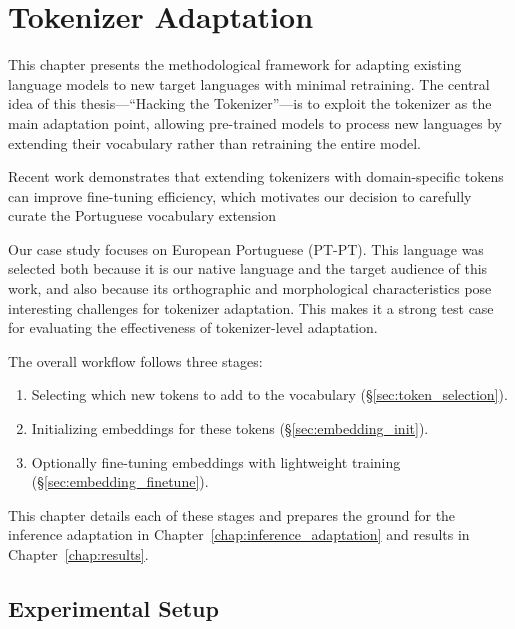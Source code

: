 
\chapter{Tokenizer Adaptation}


\label{chap:tokenizer_adaptation}

This chapter presents the methodological framework for adapting existing language models to new target languages with minimal retraining. The central idea of this thesis—“Hacking the Tokenizer”—is to exploit the tokenizer as the main adaptation point, allowing pre-trained models to process new languages by extending their vocabulary rather than retraining the entire model. 

Recent work \cite{kim2025finetune} demonstrates that extending tokenizers with domain-specific tokens can improve fine-tuning efficiency, which motivates our decision to carefully curate the Portuguese vocabulary extension

Our case study focuses on European Portuguese (PT-PT). This language was selected both because it is our native language and the target audience of this work, and also because its orthographic and morphological characteristics pose interesting challenges for tokenizer adaptation. This makes it a strong test case for evaluating the effectiveness of tokenizer-level adaptation.

The overall workflow follows three stages:
\begin{enumerate}
    \item Selecting which new tokens to add to the vocabulary (\S\ref{sec:token_selection}).
    \item Initializing embeddings for these tokens (\S\ref{sec:embedding_init}).
    \item Optionally fine-tuning embeddings with lightweight training (\S\ref{sec:embedding_finetune}).
\end{enumerate}

This chapter details each of these stages and prepares the ground for the inference adaptation in Chapter~\ref{chap:inference_adaptation} and results in Chapter~\ref{chap:results}.

\section{Experimental Setup}
\label{sec:exp_setup}

